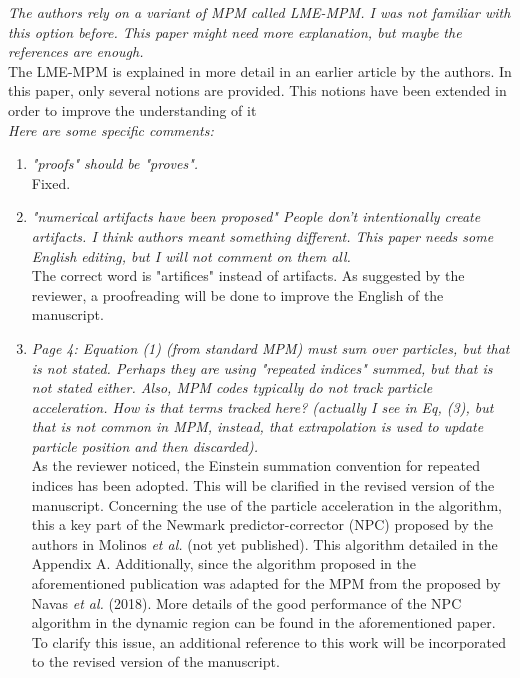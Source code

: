 \documentclass[12pt]{article}
\begin{document}
\textit{The authors rely on a variant of MPM called LME-MPM. I was not familiar with this option before. This paper might need more explanation, but maybe the references are enough.}\\

The LME-MPM is explained in more detail in an earlier article by the authors. In this paper, only several notions are provided. This notions have been extended in order to improve the understanding of it
\\

\textit{Here are some specific comments:}

 \begin{enumerate}
 
 \item \textit{"proofs" should be "proves".}\\
 
 Fixed.

 \item \textit{"numerical artifacts have been proposed" People don't intentionally create artifacts. I think authors meant something different. This paper needs some English editing, but I will not comment on them all.}\\
 
The correct word is "artifices" instead of artifacts. As suggested by the reviewer, a proofreading will be done to improve the English of the manuscript.
 
 \item \textit{Page 4: Equation (1) (from standard MPM) must sum over particles, but that is not stated. Perhaps they are using "repeated indices" summed, but that is not stated either. Also, MPM codes typically do not track particle acceleration. How is that terms tracked here? (actually I see in Eq, (3), but that is not common in MPM, instead, that extrapolation is used to update particle position and then discarded).}\\
 
As the reviewer noticed, the Einstein summation convention for repeated indices has been adopted. This will be clarified in the revised version of the manuscript. Concerning the use of the particle acceleration in the algorithm, this a key part of the Newmark predictor-corrector (NPC) proposed by the authors in Molinos {\it et al.}  \cite{Molinos_2020} (not yet published). This algorithm detailed in the Appendix A. Additionally,  since the algorithm proposed in the aforementioned publication was adapted for the MPM from the proposed by Navas {\it et al.} \cite{Navas_2018a} (2018). More details of the good performance of the NPC algorithm in the dynamic region can be found in the aforementioned paper. To clarify this issue, an additional reference to this work will be incorporated to the revised version of the manuscript.


\end{enumerate}
\end{document}
